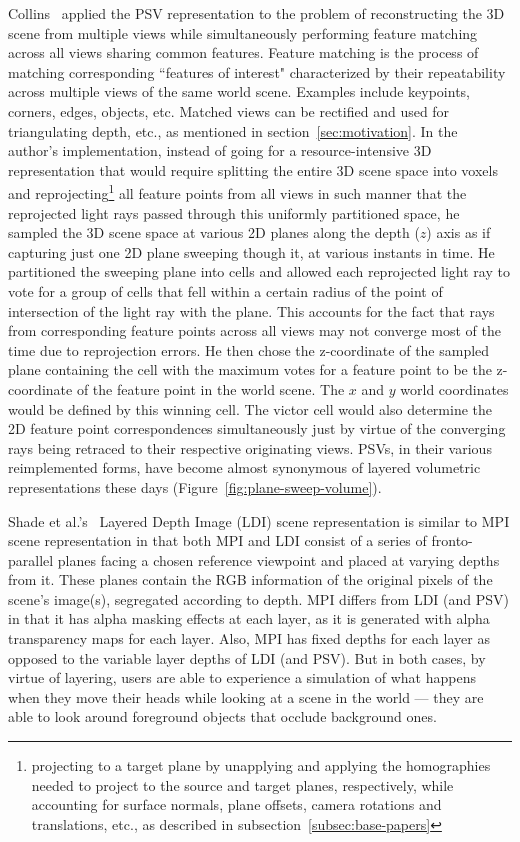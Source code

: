 Collins~\cite{collins_space-sweep_1996} applied the PSV representation to the problem of reconstructing the 3D scene from multiple views while simultaneously performing feature matching across all views sharing common features. Feature matching is the process of matching corresponding ``features of interest" characterized by their repeatability across multiple views of the same world scene. Examples include keypoints, corners, edges, objects, etc. Matched views can be rectified and used for triangulating depth, etc., as mentioned in section~\ref{sec:motivation}. In the author's implementation, instead of going for a resource-intensive 3D representation that would require splitting the entire 3D scene space into voxels and reprojecting\footnote{projecting to a target plane by unapplying and applying the homographies needed to project to the source and target planes, respectively, while accounting for surface normals, plane offsets, camera rotations and translations, etc., as described in subsection~\ref{subsec:base-papers}} all feature points from all views in such manner that the reprojected light rays passed through this uniformly partitioned space, he sampled the 3D scene space at various 2D planes along the depth ($z$) axis as if capturing just one 2D plane sweeping though it, at various instants in time. He partitioned the sweeping plane into cells and allowed each reprojected light ray to vote for a group of cells that fell within a certain radius of the point of intersection of the light ray with the plane. This accounts for the fact that rays from corresponding feature points across all views may not converge most of the time due to reprojection errors. He then chose the z-coordinate of the sampled plane containing the cell with the maximum votes for a feature point to be the z-coordinate of the feature point in the world scene. The $x$ and $y$ world coordinates would be defined by this winning cell. The victor cell would also determine the 2D feature point correspondences simultaneously just by virtue of the converging rays being retraced to their respective originating views. PSVs, in their various reimplemented forms, have become almost synonymous of layered volumetric representations these days (Figure~\ref{fig:plane-sweep-volume}).

Shade et al.'s~\cite{shade_layered_1998} Layered Depth Image (LDI) scene representation is similar to MPI scene representation in that both MPI and LDI consist of a series of fronto-parallel planes facing a chosen reference viewpoint and placed at varying depths from it. These planes contain the RGB information of the original pixels of the scene's image(s), segregated according to depth. MPI differs from LDI (and PSV) in that it has alpha masking effects at each layer, as it is generated with alpha transparency maps for each layer. Also, MPI has fixed depths for each layer as opposed to the variable layer depths of LDI (and PSV). But in both cases, by virtue of layering, users are able to experience a simulation of what happens when they move their heads while looking at a scene in the world --- they are able to look around foreground objects that occlude background ones. 

